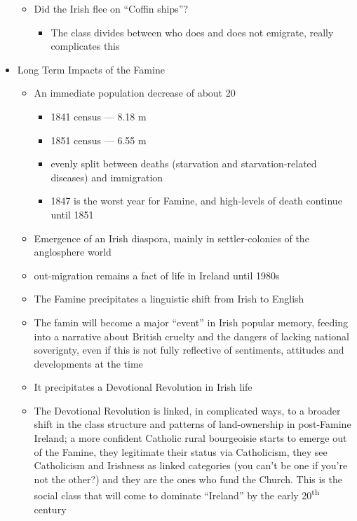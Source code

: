 \documentclass[12pt]{article}
\begin{document}
\begin{itemize}
\begin{itemize}
\begin{itemize}
                    \end{itemize}
                    \item Did the Irish flee on ``Coffin ships''?
                    \begin{itemize}
                        \item The class divides between who does and does not emigrate, really complicates this
                    \end{itemize}
                \end{itemize}
                \item Long Term Impacts of the Famine
                \begin{itemize}
                    \item An immediate population decrease of about 20%
                    \begin{itemize}
                        \item 1841 census --- 8.18 m
                        \item 1851 census --- 6.55 m
                        \item evenly split between deaths (starvation and starvation-related diseases) and immigration
                        \item 1847 is the worst year for Famine, and high-levels of death continue until 1851
                    \end{itemize}
                    \item Emergence of an Irish diaspora, mainly in settler-colonies of the anglosphere world
                    \item out-migration remains a fact of life in Ireland until 1980s
                    \item The Famine precipitates a linguistic shift from Irish to English
                    \item The famin will become a major ``event'' in Irish popular memory, feeding into a narrative about British cruelty and the dangers of lacking national soverignty, even if this is not fully reflective of sentiments, attitudes and developments at the time
                    \item It precipitates a Devotional Revolution in Irish life
                    \item The Devotional Revolution is linked, in complicated ways, to a broader shift in the class structure and patterns of land-ownership in post-Famine Ireland; a more confident Catholic rural bourgeoisie starts to emerge out of the Famine, they legitimate their status via Catholicism, they see Catholicism and Irishness as linked categories (you can't be one if you're not the other?) and they are the ones who fund the Church. This is the social class that will come to dominate ``Ireland'' by the early 20\textsuperscript{th} century

\end{itemize}
\end{itemize}
\end{document}
